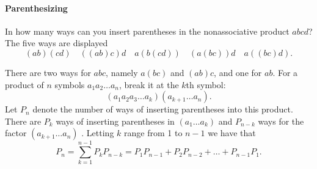 \documentclass[10pt,]{book}
\theoremstyle{plain}
\theoremstyle{definition}
\theoremstyle{definition}
\numberwithin{equation}{chapter}
\begin{document}
\paragraph[{Parenthesizing}]{Parenthesizing}\hypertarget{paragraphs-1}{}
\hypertarget{p-55}{}%
In how many ways can you insert parentheses in the nonassociative product \(abcd\)? The five ways are displayed%
\begin{equation*}
(ab)(cd)\quad ((ab)c)d \quad a(b(cd)) \quad (a(bc))d \quad a((bc)d).
\end{equation*}
%
\par
\hypertarget{p-56}{}%
There are two ways for \(abc\), namely \(a(bc)\) and \((ab)c\), and one for \(ab\). For a product of \(n\) symbols \(a_{1}a_{2}\ldots a_{n}\), break it at the \(k\)th symbol:%
\begin{equation*}
(a_{1}a_{2}a_{3}\ldots a_{k})(a_{k + 1}\ldots a_{n}).
\end{equation*}
Let \(P_{n}\) denote the number of ways of inserting parentheses into this product. There are \(P_k\) ways of inserting parentheses in \(\left(a_{1}\ldots a_{k} \right)\) and \(P_{n - k}\) ways for the factor \((a_{k + 1}\ldots a_{n})\) . Letting \(k\) range from 1 to \(n - 1\) we have that%
\begin{equation*}
P_{n} = \sum_{k = 1}^{n - 1} P_{k}P_{n - k} = P_{1}P_{n - 1} + P_{2}P_{n - 2} + \ldots + P_{n - 1}P_{1}.
\end{equation*}
%
\typeout{************************************************}
\typeout{************************************************}
\end{document}
